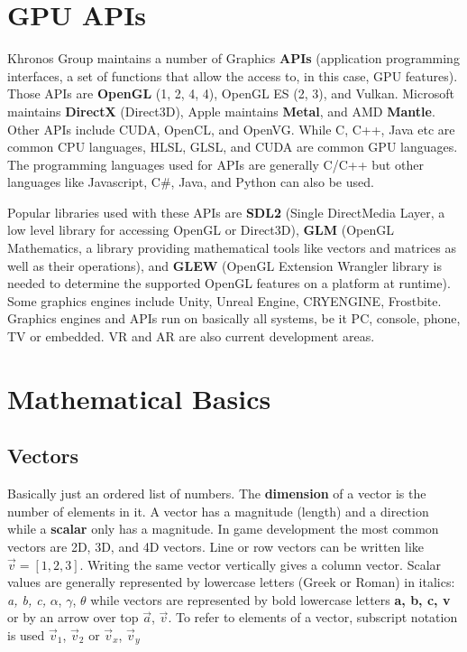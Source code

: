 \documentclass[a4paper,11pt]{amsart}
\begin{document}
\section{GPU APIs}

Khronos Group maintains a number of Graphics \textbf{APIs} (application
programming interfaces, a set of functions that allow the access to, in this 
case, GPU features). Those APIs are \textbf{OpenGL} (1, 2, 4, 4), OpenGL ES 
(2, 3), and Vulkan. Microsoft maintains \textbf{DirectX} (Direct3D), Apple 
maintains \textbf{Metal}, and AMD \textbf{Mantle}. Other APIs include CUDA, 
OpenCL, and OpenVG. While C, C++, Java etc are common CPU languages, HLSL, 
GLSL, and CUDA are common GPU languages. The programming languages used for
APIs are generally C/C++ but other languages like Javascript, C\#, Java, and 
Python can also be used. 

Popular libraries used with these APIs are \textbf{SDL2} (Single DirectMedia 
Layer, a low level library for accessing OpenGL or Direct3D), \textbf{GLM} 
(OpenGL Mathematics, a library providing mathematical tools like vectors and 
matrices as well as their operations), and \textbf{GLEW} (OpenGL Extension 
Wrangler library is needed to determine the supported OpenGL features on a 
platform at runtime). Some graphics engines include Unity, Unreal Engine, 
CRYENGINE, Frostbite. Graphics engines and APIs run on basically all systems, 
be it PC, console, phone, TV or embedded. VR and AR are also current 
development areas.

\section{Mathematical Basics}

\subsection{Vectors}

Basically just an ordered list of numbers. The \textbf{dimension} of a vector
is the number of elements in it. A vector has a magnitude (length) and
a direction while a \textbf{scalar} only has a magnitude. In game development
the most common vectors are 2D, 3D, and 4D vectors. Line or row vectors can be 
written like $\vec v = [1,2,3]$. Writing the same vector vertically gives
a column vector. Scalar values are generally represented by lowercase letters
(Greek or Roman) in italics: \textit{a, b, c,} $\alpha$, $\gamma$, $\theta$
while vectors are represented by bold lowercase letters \textbf{a, b, c, v} or
by an arrow over top $\vec a$, $\vec v$. To refer to elements of a vector,
subscript notation is used $\vec v_1$, $\vec v_2$ or $\vec v_x$, $\vec v_y$
\end{document}
